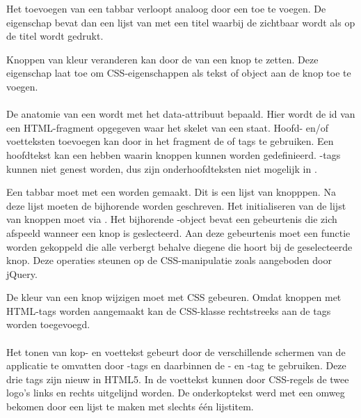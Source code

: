 Het toevoegen van een tabbar verloopt analoog door een  toe te voegen.
De  eigenschap bevat dan een lijst van  met een titel waarbij de  zichtbaar wordt als op de titel wordt gedrukt.

Knoppen van kleur veranderen kan door de  van een knop te zetten.
Deze eigenschap laat toe om CSS-eigenschappen als tekst of object aan de knop toe te voegen.

\paragraph{\kendo}
De anatomie van een  wordt met het data-attribuut  bepaald.
Hier wordt de id van een HTML-fragment opgegeven waar het skelet van een  staat.
Hoofd- en/of voetteksten toevoegen kan door in het fragment de  of  tags te gebruiken.
Een hoofdtekst kan een  hebben waarin knoppen kunnen worden gedefinieerd.
-tags kunnen niet genest worden, dus zijn onderhoofdteksten niet mogelijk in \kendo{}.

Een tabbar moet met een  worden gemaakt.
Dit is een lijst van knopppen.
Na deze lijst moeten de bijhorende  worden geschreven.
Het initialiseren van de lijst van knoppen moet via .
Het bijhorende \js-object bevat een  gebeurtenis die zich afspeeld wanneer een knop is geslecteerd.
Aan deze gebeurtenis moet een functie worden gekoppeld die alle  verbergt behalve diegene die hoort bij de geselecteerde knop.
Deze operaties steunen op de CSS-manipulatie zoals aangeboden door jQuery.

De kleur van een knop wijzigen moet met CSS gebeuren.
Omdat knoppen met HTML-tags worden aangemaakt kan de CSS-klasse rechtstreeks aan de tags worden toegevoegd.

\paragraph{\lungo}
Het tonen van kop- en voettekst gebeurt door de verschillende schermen van de applicatie te omvatten door -tags en daarbinnen de - en -tag te gebruiken.
Deze drie tags zijn nieuw in HTML5.
In de voettekst kunnen door CSS-regels de twee logo's links en rechts uitgelijnd worden.
De onderkoptekst werd met een omweg bekomen door een lijst te maken met slechts één lijstitem.

